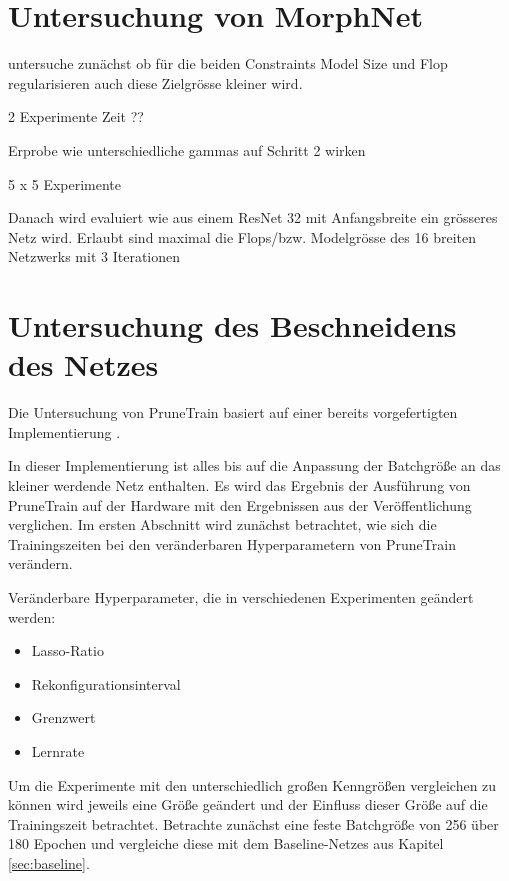 \chapter{Untersuchung von MorphNet}\label{sec:morphexperimente}

untersuche zunächst ob für die beiden Constraints Model Size und Flop regularisieren auch diese Zielgrösse kleiner wird.

2 Experimente Zeit ??


Erprobe wie unterschiedliche gammas auf Schritt 2 wirken


5 x 5 Experimente 


Danach wird evaluiert wie aus einem ResNet 32 mit Anfangsbreite ein grösseres Netz wird. Erlaubt sind maximal die Flops/bzw. Modelgrösse des 16 breiten Netzwerks mit 3 Iterationen












\chapter{Untersuchung des Beschneidens des Netzes}\label{sec:ptexperimente}

Die Untersuchung von PruneTrain basiert auf einer bereits vorgefertigten Implementierung \cite{ptImpl}. 


In dieser Implementierung ist alles bis auf die Anpassung der Batchgröße an das kleiner werdende Netz enthalten. Es wird das Ergebnis der Ausführung von PruneTrain auf der Hardware mit den Ergebnissen aus der Veröffentlichung verglichen\cite{prunetrain}. Im ersten Abschnitt wird zunächst betrachtet, wie sich die Trainingszeiten bei den veränderbaren Hyperparametern von PruneTrain verändern.

Veränderbare Hyperparameter, die in verschiedenen Experimenten geändert werden:

\begin{itemize}
 \item Lasso-Ratio
 \item Rekonfigurationsinterval
 \item Grenzwert
 \item Lernrate
\end{itemize}

Um die Experimente mit den unterschiedlich großen Kenngrößen vergleichen zu können wird jeweils eine Größe geändert und der Einfluss dieser Größe auf die Trainingszeit betrachtet. Betrachte zunächst eine feste Batchgröße von 256 über 180 Epochen und vergleiche diese mit dem Baseline-Netzes aus Kapitel \ref{sec:baseline}. 


